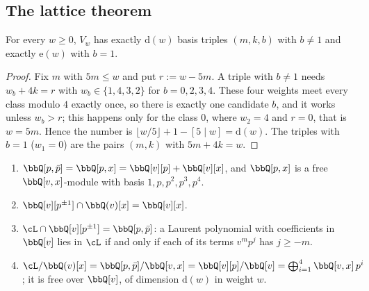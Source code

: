 \subsection{The lattice theorem}
\label{sec:mod-lattice}

\begin{lem}[Counting]
\label{lem:mod-count}
For every $w\geq 0$, $V_w$ has exactly $\mathrm d(w)$ basis triples $(m,k,b)$ with $b\neq 1$ and exactly $\mathrm e(w)$ with $b=1$.
\end{lem}

\begin{proof}
Fix $m$ with $5m\leq w$ and put $r:=w-5m$. A triple with $b\neq 1$ needs $w_b+4k=r$ with $w_b\in\{1,4,3,2\}$ for $b=0,2,3,4$. These four weights meet every class modulo $4$ exactly once, so there is exactly one candidate $b$, and it works unless $w_b>r$; this happens only for the class $0$, where $w_2=4$ and $r=0$, that is $w=5m$. Hence the number is $\lfloor w/5\rfloor+1-[5\mid w]=\mathrm d(w)$. The triples with $b=1$ ($w_1=0$) are the pairs $(m,k)$ with $5m+4k=w$.
\end{proof}

\begin{lem}
\label{lem:mod-classL}
\begin{enumerate}
\item $\bbQ[p,\bar p]=\bbQ[p,x]=\bbQ[v][p]+\bbQ[v][x]$, and $\bbQ[p,x]$ is a free $\bbQ[v,x]$-module with basis $1,p,p^2,p^3,p^4$.
\item $\bbQ[v][p^{\pm1}]\cap\bbQ(v)[x]=\bbQ[v][x]$.
\item $\cL\cap\bbQ[v][p^{\pm1}]=\bbQ[p,\bar p]$: a Laurent polynomial with coefficients in $\bbQ[v]$ lies in $\cL$ if and only if each of its terms $v^mp^j$ has $j\geq -m$.
\item $\cL/\bbQ(v)[x]=\bbQ[p,\bar p]/\bbQ[v,x]=\bbQ[v][p]/\bbQ[v]=\bigoplus_{i=1}^4\bbQ[v,x]\,p^i$; it is free over $\bbQ[v]$, of dimension $\mathrm d(w)$ in weight $w$.
\end{enumerate}
\end{lem}

